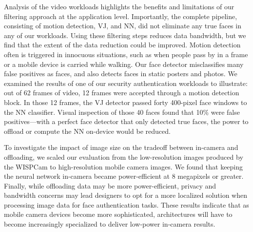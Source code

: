 Analysis of the video workloads highlights the benefits and limitations of our filtering approach at the application level. Importantly, the complete pipeline, consisting of motion detection, VJ, and NN, did not eliminate any true faces in any of our workloads. Using these filtering steps reduces data bandwidth, but we find that the extent of the data reduction could be improved. Motion detection often is triggered in innocuous situations, such as when people pass by in a frame or a mobile device is carried while walking. Our face detector misclassifies many false positives as faces, and also detects faces in static posters and photos. We examined the results of one of our security authentication workloads to illustrate: out of 62 frames of video, 12 frames were accepted through a motion detection block. In those 12 frames, the VJ detector passed forty 400-pixel face windows to the NN classifier. Visual inspection of those 40 faces found that 10\% were false positives---with a perfect face detector that only detected true faces, the power to offload or compute the NN on-device would be reduced.

To investigate the impact of image size on the tradeoff between in-camera and offloading, we scaled our evaluation from the low-resolution images produced by the WISPCam to high-resolution mobile camera images. We found that keeping the neural network in-camera became power-efficient at 8 megapixels or greater. Finally, while offloading data may be more power-efficient, privacy and bandwidth concerns may lead designers to opt for a more localized solution when processing image data for face authentication tasks. These results indicate that as mobile camera devices become more sophisticated, architectures will have to become increasingly specialized to deliver low-power in-camera results.





